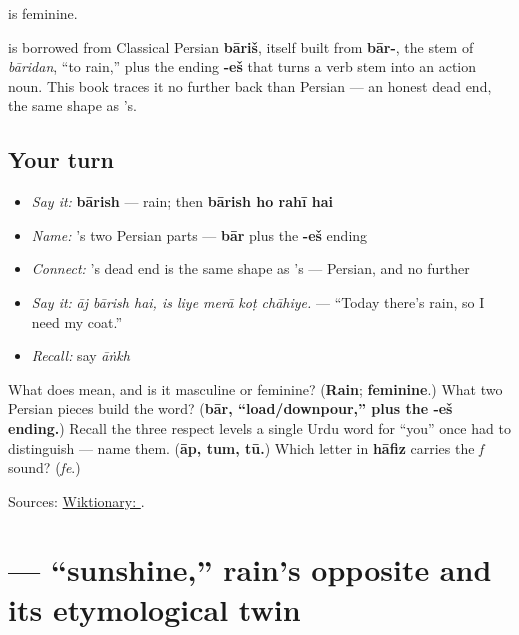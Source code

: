 \textbf{} is feminine.

\begin{cousinweb}
\textbf{} is borrowed from Classical Persian \textbf{bāriš}, itself built from \textbf{bār-}, the stem of \emph{bāridan}, \textquotedblleft{}to rain,\textquotedblright{} plus the ending \textbf{-eš} that turns a verb stem into an action noun. This book traces it no further back than Persian — an honest dead end, the same shape as \textbf{}'s.
\end{cousinweb}

\subsection*{Your turn}
\begin{itemize}
\raggedright
  \item \emph{Say it:} \textbf{bārish} — rain; then \textbf{bārish ho rahī hai}
  \item \emph{Name:} \textbf{}'s two Persian parts — \textbf{bār} plus the \textbf{-eš} ending
  \item \emph{Connect:} \textbf{}'s dead end is the same shape as \textbf{}'s — Persian, and no further
  \item \emph{Say it:} \emph{āj bārish hai, is liye merā koṭ chāhiye.} — \textquotedblleft{}Today there's rain, so I need my coat.\textquotedblright{}
  \item \emph{Recall:} say \emph{āṅkh}
\end{itemize}

\begin{tcolorbox}[breakable,colback=teal!4,colframe=teal!35!black,title={Before you move on}]
What does \textbf{} mean, and is it masculine or feminine? (\textbf{Rain}; \textbf{feminine}.) What two Persian pieces build the word? (\textbf{bār, \textquotedblleft{}load/downpour,\textquotedblright{} plus the -eš ending.}) Recall the three respect levels a single Urdu word for \textquotedblleft{}you\textquotedblright{} once had to distinguish — name them. (\textbf{āp, tum, tū.}) Which letter in \textbf{hāfiz} carries the \emph{f} sound? (\emph{fe}.)

Sources: \href{https://en.wiktionary.org/wiki/\%D8\%A8\%D8\%A7\%D8\%B1\%D8\%B4}{Wiktionary: }.
\end{tcolorbox}
\section[\texorpdfstring{\ur{دھوپ} (dhūp)}{دھوپ (dhūp)}]{ — \textquotedblleft{}sunshine,\textquotedblright{} rain's opposite and its etymological twin}

